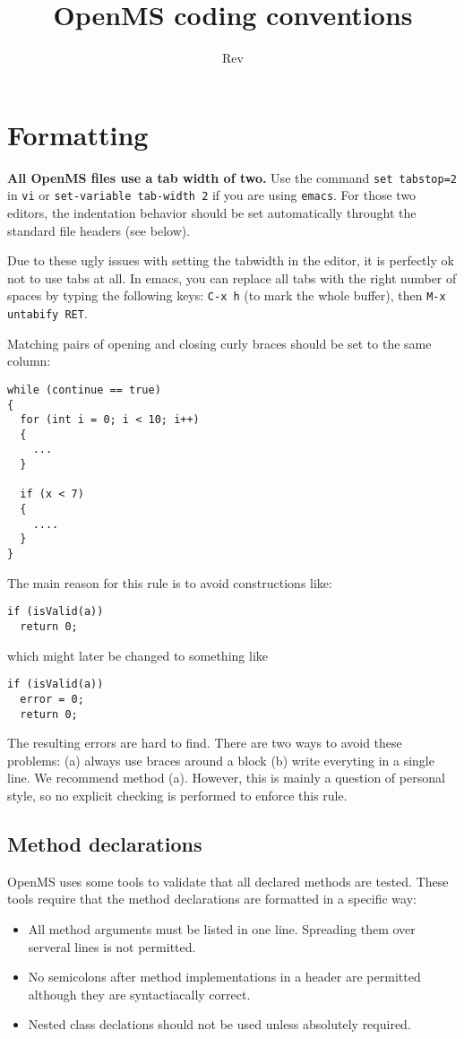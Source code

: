 \documentclass[a4]{article}
\title{OpenMS coding conventions}
\date{$ $Rev$ $}
\author{}
\begin{document}
\maketitle

\section{Formatting}

{\bf All OpenMS files use a tab width of two.} Use the command {\tt set tabstop=2} in
{\tt vi} or {\tt set-variable tab-width 2} if you are using {\tt emacs}. For
those two editors, the indentation behavior should be set automatically
throught the standard file headers (see below).

Due to these ugly issues with setting the tabwidth in the editor, it is
perfectly ok not to use tabs at all.  In emacs, you can replace all tabs with
the right number of spaces by typing the following keys: \texttt{C-x h} (to
mark the whole buffer), then \texttt{M-x untabify RET}.

Matching pairs of opening and closing curly braces should be set to the same
column:
\begin{verbatim}
while (continue == true)
{
  for (int i = 0; i < 10; i++)
  {
    ...
  }

  if (x < 7)
  {
    ....
  }
}
\end{verbatim}
The main reason for this rule is to avoid constructions like:

\begin{verbatim}
if (isValid(a))
  return 0;
\end{verbatim}

which might later be changed to something like

\begin{verbatim}
if (isValid(a))
  error = 0;
  return 0;
\end{verbatim}

The resulting errors are hard to find. There are two ways to avoid these
problems: (a) always use braces around a block (b) write everyting in a single
line. We recommend method (a).
However, this is mainly a question of personal style, so no explicit checking
is performed to enforce this rule.

\subsection{Method declarations}
OpenMS uses some tools to validate that all declared methods are tested.
These tools require that the method declarations are formatted in a specific 
way:
\begin{itemize}
	\item All method arguments must be listed in one line. Spreading them over serveral lines is not permitted.
	\item No semicolons after method implementations in a header are permitted although they are syntactiacally correct.
	\item Nested class declations should not be used unless absolutely required.
\end{itemize}
\end{document}
